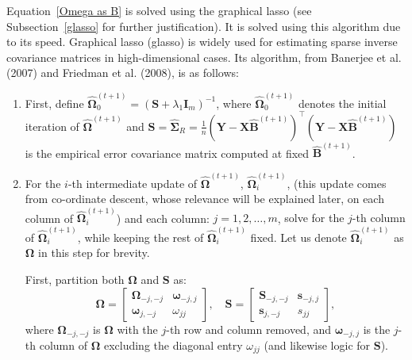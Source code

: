 \documentclass[11pt]{report} %
\begin{document}
Equation~\ref{Omega as B} is solved using the graphical lasso (see Subsection~\ref{glasso} for further justification). It is solved using this algorithm due to its speed.\cite{rothman2010sparse} Graphical lasso (glasso) is widely used for estimating sparse inverse covariance matrices in high-dimensional cases. Its algorithm, from Banerjee et al. (2007) and Friedman et al. (2008), is as follows:
\begin{enumerate}
    \item First, define \( \boldsymbol{\hat{\Omega}}^{(t+1)}_{0} = (\mathbf{S} + \lambda_1 \mathbf{I}_m)^{-1} \), where $\boldsymbol{\hat{\Omega}}^{(t+1)}_{0}$ denotes the initial iteration of $\boldsymbol{\hat{\Omega}}^{(t+1)}$ and \( \mathbf{S} = \hat{\boldsymbol{\Sigma}}_R = \frac{1}{n} (\mathbf{Y} - \mathbf{X} \mathbf{\hat{B}}^{({t+1})})^\top (\mathbf{Y} - \mathbf{X} \mathbf{\hat{B}}^{({t+1})}) \) is the empirical error covariance matrix computed at fixed \( \mathbf{\hat{B}}^{({t+1})} \). 
    
    
    \item For the $i$-th intermediate update of $\mathbf{\hat{\Omega}}^{(t+1)}$, $\mathbf{\hat{\Omega}}^{(t+1)}_i$, (this update comes from co-ordinate descent, whose relevance will be explained later, on each column of $\mathbf{\hat{\Omega}}^{(t+1)}_i$) and each column: \( j = 1, 2, \dots, m\), {solve for the \( j \)-th column of $\mathbf{\hat{\Omega}}^{(t+1)}_i$}, {while keeping the rest of $\mathbf{\hat{\Omega}}^{(t+1)}_i$ fixed}. Let us denote $\mathbf{\hat{\Omega}}^{(t+1)}_i$ as $\mathbf{\Omega}$ in this step for brevity.



        First, partition both \( \mathbf{\Omega} \) and \( \mathbf{S} \) as:
  \[
  \mathbf{\Omega} = \begin{bmatrix}
    \mathbf{\Omega}_{-j,-j} & \boldsymbol{\omega}_{-j,j} \\
    \boldsymbol{\omega}_{j,-j} & \omega_{jj}
  \end{bmatrix},
  \quad
  \mathbf{S} = \begin{bmatrix}
    \mathbf{S}_{-j,-j} & \mathbf{s}_{-j,j} \\
    \mathbf{s}_{j,-j} & s_{jj}
  \end{bmatrix},
  \]
  where \( \mathbf{\Omega}_{-j,-j} \) is \( \mathbf{\Omega} \) with the \( j \)-th row and column removed, and \( \boldsymbol{\omega}_{-j,j} \) is the \( j \)-th column of $\mathbf{\Omega}$ excluding the diagonal entry \( \omega_{jj} \) (and likewise logic for $\mathbf{S}$).


\end{enumerate}
\end{document}
